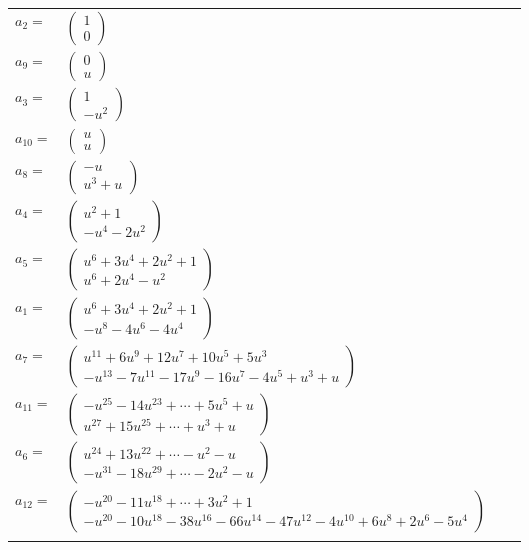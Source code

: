 \documentclass[1p]{elsarticle_modified}
\theoremstyle{definition}
\begin{document}
\begin{tabular}{m{7pt} m{180pt} m{7pt} m{180pt} }
\flushright $a_{2}=$&$\begin{pmatrix}1\\0\end{pmatrix}$ \\
\flushright $a_{9}=$&$\begin{pmatrix}0\\u\end{pmatrix}$ \\
\flushright $a_{3}=$&$\begin{pmatrix}1\\- u^2\end{pmatrix}$ \\
\flushright $a_{10}=$&$\begin{pmatrix}u\\u\end{pmatrix}$ \\
\flushright $a_{8}=$&$\begin{pmatrix}- u\\u^3+u\end{pmatrix}$ \\
\flushright $a_{4}=$&$\begin{pmatrix}u^2+1\\- u^4-2 u^2\end{pmatrix}$ \\
\flushright $a_{5}=$&$\begin{pmatrix}u^6+3 u^4+2 u^2+1\\u^6+2 u^4- u^2\end{pmatrix}$ \\
\flushright $a_{1}=$&$\begin{pmatrix}u^6+3 u^4+2 u^2+1\\- u^8-4 u^6-4 u^4\end{pmatrix}$ \\
\flushright $a_{7}=$&$\begin{pmatrix}u^{11}+6 u^9+12 u^7+10 u^5+5 u^3\\- u^{13}-7 u^{11}-17 u^9-16 u^7-4 u^5+u^3+u\end{pmatrix}$ \\
\flushright $a_{11}=$&$\begin{pmatrix}- u^{25}-14 u^{23}+\cdots+5 u^5+u\\u^{27}+15 u^{25}+\cdots+u^3+u\end{pmatrix}$ \\
\flushright $a_{6}=$&$\begin{pmatrix}u^{24}+13 u^{22}+\cdots- u^2- u\\- u^{31}-18 u^{29}+\cdots-2 u^2- u\end{pmatrix}$ \\
\flushright $a_{12}=$&$\begin{pmatrix}- u^{20}-11 u^{18}+\cdots+3 u^2+1\\- u^{20}-10 u^{18}-38 u^{16}-66 u^{14}-47 u^{12}-4 u^{10}+6 u^8+2 u^6-5 u^4\end{pmatrix}$\\&\end{tabular}
\end{document}
